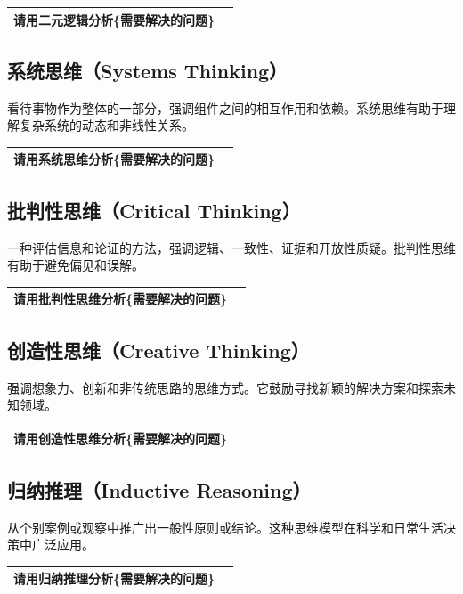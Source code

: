 \documentclass[12pt]{book}
\begin{document}
\begin{tabular}{|p{15cm}|p{3cm}|}
	\hline
请用二元逻辑分析\{需要解决的问题\}\\
	\hline
\end{tabular}


\subsection{系统思维（Systems Thinking）}
\bigskip
  看待事物作为整体的一部分，强调组件之间的相互作用和依赖。系统思维有助于理解复杂系统的动态和非线性关系。

\begin{tabular}{|p{15cm}|p{3cm}|}
	\hline
请用系统思维分析\{需要解决的问题\}\\
	\hline
\end{tabular}

\subsection{批判性思维（Critical Thinking）}
\bigskip
  一种评估信息和论证的方法，强调逻辑、一致性、证据和开放性质疑。批判性思维有助于避免偏见和误解。

\begin{tabular}{|p{15cm}|p{3cm}|}
	\hline
请用批判性思维分析\{需要解决的问题\}\\
	\hline
\end{tabular}


\subsection{创造性思维（Creative Thinking）}
\bigskip
  强调想象力、创新和非传统思路的思维方式。它鼓励寻找新颖的解决方案和探索未知领域。

\begin{tabular}{|p{15cm}|p{3cm}|}
	\hline
请用创造性思维分析\{需要解决的问题\}\\
	\hline
\end{tabular}

\subsection{归纳推理（Inductive Reasoning）}
\bigskip
  从个别案例或观察中推广出一般性原则或结论。这种思维模型在科学和日常生活决策中广泛应用。

\begin{tabular}{|p{15cm}|p{3cm}|}
	\hline
请用归纳推理分析\{需要解决的问题\}\\
	\hline
\end{tabular}
\end{document}
